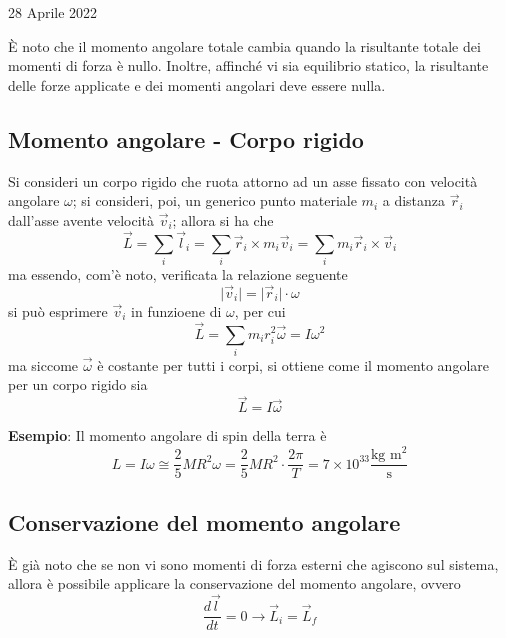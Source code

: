 \documentclass[a4paper]{extarticle}
\begin{document}
\newpage
\noindent
\begin{center}
  28 Aprile 2022
\end{center}
È noto che il momento angolare totale cambia quando la risultante totale dei momenti di forza è nullo. Inoltre, affinché vi sia equilibrio statico, la risultante delle forze applicate e dei momenti angolari deve essere nulla.

\vspace{1em}
\subsection{Momento angolare - Corpo rigido}
Si consideri un corpo rigido che ruota attorno ad un asse fissato con velocità angolare $\omega$; si consideri, poi, un generico punto materiale $m_i$ a distanza $\vec r_i$ dall'asse avente velocità $\vec v_i$; allora si ha che
\[\vec L = \sum_i \vec l_i = \sum_i \vec r_i \times m_i \vec v_i = \sum_i m_i \vec r_i \times \vec v_i\]
ma essendo, com'è noto, verificata la relazione seguente
\[\vert \vec v_i \vert = \vert \vec r_i \vert \cdot \omega\]
si può esprimere $\vec v_i$ in funzioene di $\omega$, per cui
\[\vec L = \sum_i m_i r_i^2 \vec \omega = I \omega^2\]
ma siccome $\vec \omega$ è costante per tutti i corpi, si ottiene come il momento angolare per un corpo rigido sia
\[\boxed{\vec L = I \vec \omega}\]

\vspace{1em}
\noindent
\textbf{Esempio}: Il momento angolare di spin della terra è
\[L=I\omega \cong \frac{2}{5} M R^2 \omega = \frac{2}{5}M R^2 \cdot \frac{2\pi}{T} = 7 \times 10^{33} \frac{\text{kg m}^2}{\text{s}}\]

\vspace{1em}
\noindent
\subsection{Conservazione del momento angolare}
È già noto che se non vi sono momenti di forza esterni che agiscono sul sistema, allora è possibile applicare la conservazione del momento angolare, ovvero
\[\frac{d \vec l}{dt} = 0 \longrightarrow \vec L_i = \vec L_f\]
\end{document}
